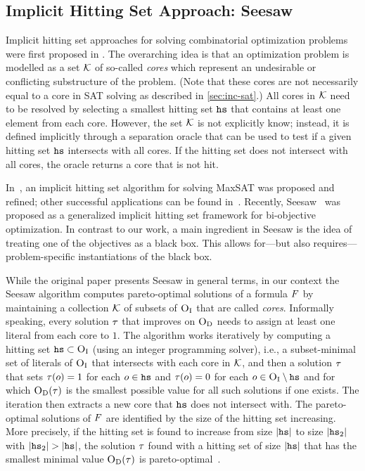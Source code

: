 \subsection{Implicit Hitting Set Approach: Seesaw\label{sec:seesaw}}

Implicit hitting set approaches for solving combinatorial optimization problems were first proposed in \textcite{DBLP:journals/ior/Moreno-CentenoK13}.
The overarching idea is that an optimization problem is modelled as a set $\mathcal{K}$ of so-called \emph{cores} which represent an undesirable or conflicting substructure of the problem.
(Note that these cores are not necessarily equal to a core in SAT solving as described in \cref{sec:inc-sat}.)
All cores in $\mathcal{K}$ need to be resolved by selecting a smallest hitting set $\texttt{hs}$ that contains at least one element from each core.
However, the set $\mathcal{K}$ is not explicitly know;
instead, it is defined implicitly through a separation oracle that can be used to test if a given hitting set $\texttt{hs}$ intersects with all cores.
If the hitting set does not intersect with all cores, the oracle returns a core that is not hit.

In~\textcite{DBLP:conf/cp/DaviesB13,DBLP:conf/sat/DaviesB13,DBLP:conf/cp/DaviesB11,DBLP:conf/sat/BergBP20}, an implicit hitting set algorithm for solving MaxSAT was proposed and refined;
other successful applications can be found in~\textcite{DBLP:conf/cp/IgnatievPLM15,DBLP:conf/kr/SaikkoWJ16,DBLP:conf/cade/FazekasBB18,DBLP:conf/kr/SaikkoDAJ18}.
Recently, Seesaw~\autocite{DBLP:conf/cp/JanotaMSM21} was proposed as a generalized implicit hitting set framework for bi-objective optimization.
In contrast to our work, a main ingredient in Seesaw is the idea of treating one of the objectives as a black box.
This allows for---but also requires---problem-specific instantiations of the black box.

While the original paper presents Seesaw in general terms, in our context the Seesaw algorithm computes pareto-optimal solutions of a formula $F$ by maintaining a collection $\mathcal{K}$ of subsets of $\textsc{O}_{\text{I}}$ that are called \emph{cores}.
Informally speaking, every solution $\tau$ that improves on $\textsc{O}_{\text{D}}$ needs to assign at least one literal from each core to $1$.
The algorithm works iteratively by computing a hitting set $\texttt{hs} \subset \textsc{O}_{\text{I}}$ (using an integer programming solver), i.e., a subset-minimal set of literals of $\textsc{O}_{\text{I}}$ that intersects with each core in $\mathcal{K}$, and then a solution $\tau$ that sets $\tau(o) = 1$ for each $o \in \texttt{hs}$ and $\tau(o) = 0$ for each $o \in \textsc{O}_{\text{I}} \setminus \texttt{hs}$ and for which $\textsc{O}_{\text{D}}(\tau)$ is the smallest possible value for all such solutions if one exists.
The iteration then extracts a new core that $\texttt{hs}$ does not intersect with.
The pareto-optimal solutions of $F$ are identified by the size of the hitting set increasing.
More precisely, if the hitting set is found to increase from size $|\texttt{hs}|$ to size $|\texttt{hs}_2|$ with $|\hs_2|>|\hs|$, the solution $\tau$ found with a hitting set of size $|\texttt{hs}|$ that has the smallest minimal value $\textsc{O}_{\text{D}}(\tau)$ is pareto-optimal~\autocite{DBLP:conf/cp/JanotaMSM21}.

